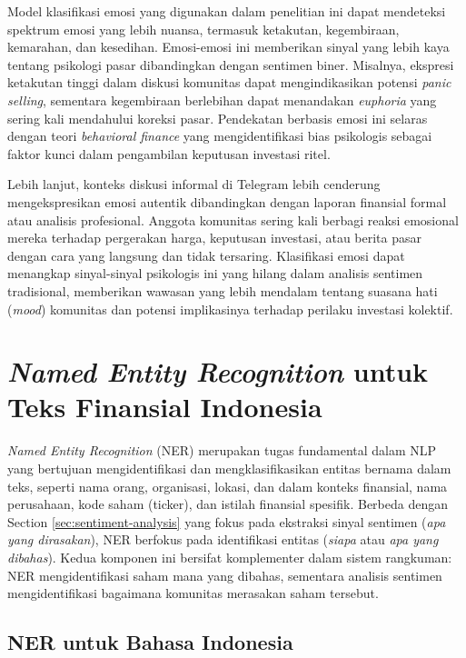 Model klasifikasi emosi yang digunakan dalam penelitian ini dapat mendeteksi spektrum emosi yang lebih nuansa, termasuk ketakutan, kegembiraan, kemarahan, dan kesedihan. Emosi-emosi ini memberikan sinyal yang lebih kaya tentang psikologi pasar dibandingkan dengan sentimen biner. Misalnya, ekspresi ketakutan tinggi dalam diskusi komunitas dapat mengindikasikan potensi \textit{panic selling}, sementara kegembiraan berlebihan dapat menandakan \textit{euphoria} yang sering kali mendahului koreksi pasar. Pendekatan berbasis emosi ini selaras dengan teori \textit{behavioral finance} yang mengidentifikasi bias psikologis sebagai faktor kunci dalam pengambilan keputusan investasi ritel.

Lebih lanjut, konteks diskusi informal di Telegram lebih cenderung mengekspresikan emosi autentik dibandingkan dengan laporan finansial formal atau analisis profesional. Anggota komunitas sering kali berbagi reaksi emosional mereka terhadap pergerakan harga, keputusan investasi, atau berita pasar dengan cara yang langsung dan tidak tersaring. Klasifikasi emosi dapat menangkap sinyal-sinyal psikologis ini yang hilang dalam analisis sentimen tradisional, memberikan wawasan yang lebih mendalam tentang suasana hati (\textit{mood}) komunitas dan potensi implikasinya terhadap perilaku investasi kolektif.

\section{\textit{Named Entity Recognition} untuk Teks Finansial Indonesia}
\label{sec:ner}

\textit{Named Entity Recognition} (NER) merupakan tugas fundamental dalam NLP yang bertujuan mengidentifikasi dan mengklasifikasikan entitas bernama dalam teks, seperti nama orang, organisasi, lokasi, dan dalam konteks finansial, nama perusahaan, kode saham (ticker), dan istilah finansial spesifik. Berbeda dengan Section \ref{sec:sentiment-analysis} yang fokus pada ekstraksi sinyal sentimen (\textit{apa yang dirasakan}), NER berfokus pada identifikasi entitas (\textit{siapa} atau \textit{apa yang dibahas}). Kedua komponen ini bersifat komplementer dalam sistem rangkuman: NER mengidentifikasi saham mana yang dibahas, sementara analisis sentimen mengidentifikasi bagaimana komunitas merasakan saham tersebut.

\subsection{NER untuk Bahasa Indonesia}

